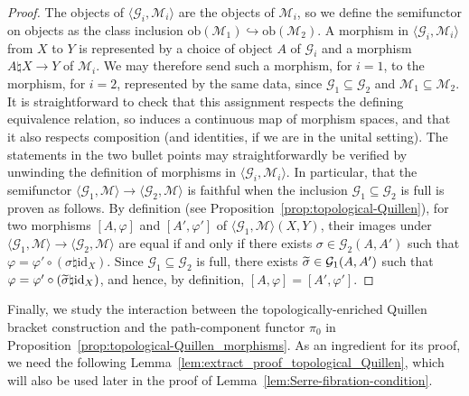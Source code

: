 \documentclass[AHL,Unicode,published]{cedram}
\newcommand{\obj}{\ensuremath{\mathrm{ob}}}
\newcommand{\id}{\mathrm{id}}
\newcommand{\cG}{\mathcal{G}}
\newcommand{\cM}{\mathcal{M}}
\let\oldtilde\tilde
\renewcommand*{\tilde}[1]{\mathchoice{\widetilde{#1}}{\widetilde{#1}}{\oldtilde{#1}}{\oldtilde{#1}}}
\begin{document}
\begin{proof}
The objects of $\langle \cG_{i},\cM_{i} \rangle$ are the objects of $\cM_{i}$, so we define the semifunctor on objects as the class inclusion $\obj(\cM_{1}) \hookrightarrow \obj(\cM_{2})$. A morphism in $\langle \cG_{i},\cM_{i} \rangle$ from $X$ to $Y$ is represented by a choice of object $A$ of $\cG_{i}$ and a morphism $A \natural X \to Y$ of $\cM_{i}$. We may therefore send such a morphism, for $i=1$, to the morphism, for $i=2$, represented by the same data, since $\cG_{1} \subseteq \cG_{2}$ and $\cM_{1} \subseteq \cM_{2}$. It is straightforward to check that this assignment respects the defining equivalence relation, so induces a continuous map of morphism spaces, and that it also respects composition (and identities, if we are in the unital setting). The statements in the two bullet points may straightforwardly be verified by unwinding the definition of morphisms in $\langle \cG_{i},\cM_{i} \rangle$. In particular, that the semifunctor $\langle \cG_{1}, \cM \rangle \to \langle \cG_{2}, \cM \rangle$ is faithful when the inclusion $\cG_{1} \subseteq \cG_{2}$ is full is proven as follows. By definition (see Proposition~\ref{prop:topological-Quillen}), for two morphisms $[A,\varphi]$ and $[A',\varphi']$ of $\langle \cG_{1}, \cM \rangle(X,Y)$, their images under $\langle \cG_{1}, \cM \rangle \to \langle \cG_{2}, \cM \rangle$ are equal if and only if there exists $\sigma \in \cG_{2}(A,A')$ such that $\varphi = \varphi' \circ (\sigma \natural \id_{X})$. Since $\cG_{1} \subseteq \cG_{2}$ is full, there exists $\tilde{\sigma} \in \cG_{1}(A,A')$ such that $\varphi = \varphi' \circ (\tilde{\sigma} \natural \id_{X})$, and hence, by definition, $[A,\varphi]=[A',\varphi']$.
\end{proof}

Finally, we study the interaction between the topologically-enriched Quillen bracket construction and the path-component functor $\pi_{0}$ in Proposition~\ref{prop:topological-Quillen_morphisms}. As an ingredient for its proof, we need the following Lemma~\ref{lem:extract_proof_topological_Quillen}, which will also be used later in the proof of Lemma~\ref{lem:Serre-fibration-condition}.
\end{document}
